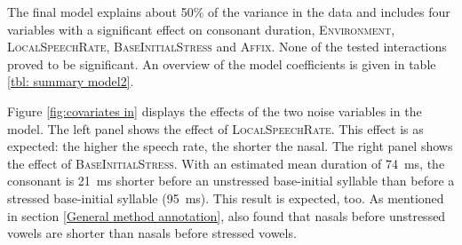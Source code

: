 The final model explains about 50\% of the variance in the data and includes four variables with a significant effect on consonant duration, \textsc{Environment}, \textsc{LocalSpeechRate}, \textsc{BaseInitialStress} and \textsc{Affix}. None of the tested interactions proved to be significant. 
An overview of the model coefficients is given in table \ref{tbl: summary model2}.%

\clearpage

\begin{table}[h!]

	\caption{ Summary of linear model for variables predicting the Box-Cox-transformed duration of [m] in prefixed words}
	\label{tbl: summary model2}
	\begin{center}
	\end{center}
\vspace*{-0.4cm}
\end{table}


Figure \ref{fig:covariates in} displays the effects of the two noise variables in the model. The left panel shows the effect of  \textsc{LocalSpeechRate}. This effect is as expected: 
the higher the speech rate, the shorter the nasal. The right panel shows the effect of \textsc{BaseInitialStress}. With an estimated mean duration of 74~ms, the consonant is 21~ms shorter before an unstressed base-initial syllable than before a stressed base-initial syllable (95~ms). This result is expected, too. As mentioned in section \ref{General method annotation}, \cite{Umeda.1977} also found that nasals before unstressed vowels are shorter than nasals before stressed vowels.

